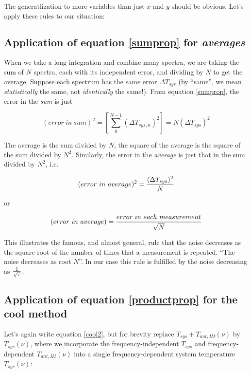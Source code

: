 \noindent The generatlization to more variables than just $x$ and $y$
should be obvious. Let's apply these rules to our situation:

\subsection{ Application of equation \ref{sumprop} for {\it averages}}

	When we take a long integration and combine many spectra, we are
taking the sum of $N$ spectra, each with its independent error, and
dividing by $N$ to get the average. Suppose each spectrum has the same
error $\Delta T_{sys}$ (by ``same'', we mean {\it statistically} the
same, not {\it identically} the same!). From equation \ref{sumprop},
the error in the {\it sum} is just

\begin{mathletters}
\begin{equation}
(error \ in \ sum)^2 = \left[ \sum_0^{N-1} (\Delta T_{sys,n})^2 \right]
=	N (\Delta T_{sys})^2
\end{equation}

\noindent The average is the sum divided by $N$, the square of the
average is the square of the sum divided by $N^2$. Similarly, the error
in the {\it average} is just that in the sum divided by $N^2$, i.e.

\begin{equation} 
(error \ in \ average)^2 = {(\Delta T_{sys})^2 \over N}
\end{equation}
 
\noindent or

\begin{equation} 
(error \ in \ average) = { error \ in \ each \ measurement  \over \sqrt{N}}
\end{equation}
\end{mathletters}

	This illustrates the famous, and almost general, rule that the
noise decreases as the square root of the number of times that a
measurement is repeated. ``The noise decreases as root $N$''. In our
case this rule is fulfilled by the noise decreasing as $1 \over
\sqrt{\tau}$. 

\subsection{ Application of equation \ref{productprop} for the cool
method}

	Let's again write equation \ref{cool2}, but for brevity replace 
$T_{sys} + T_{ant, HI}(\nu)$ by $T_{sys}(\nu)$, where we incorporate the
frequency-independent $T_{sys}$ and frequency-dependent $T_{ant,
HI}(\nu)$ into a single frequency-dependent system temperature
$T_{sys}(\nu)$: 

